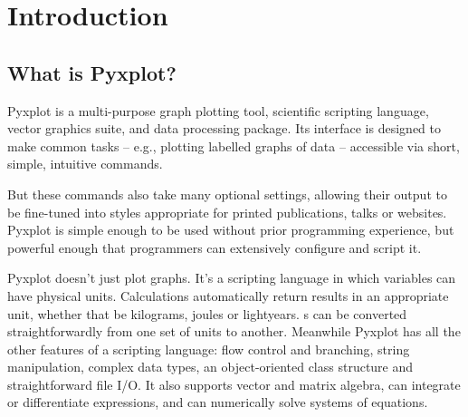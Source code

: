 %
%
%
%
%



\chapter{Introduction}

\label{ch:introduction}

\section{What is Pyxplot?}

Pyxplot is a multi-purpose graph plotting tool, scientific scripting language,
vector graphics suite, and data processing package.  Its interface is designed
to make common tasks -- e.g., plotting labelled graphs of data -- accessible
via short, simple, intuitive commands.

But these commands also take many optional settings, allowing their output to
be fine-tuned into styles appropriate for printed publications, talks or
websites.  Pyxplot is simple enough to be used without prior programming
experience, but powerful enough that programmers can extensively configure and
script it.


Pyxplot doesn't just plot graphs. It's a scripting language in which variables
can have physical units. Calculations automatically return results in an
appropriate unit, whether that be kilograms, joules or lightyears.  \Datafile s
can be converted straightforwardly from one set of units to another. Meanwhile
Pyxplot has all the other features of a scripting language: flow control and
branching, string manipulation, complex data types, an object-oriented class
structure and straightforward file I/O.  It also supports vector and matrix
algebra, can integrate or differentiate expressions, and can numerically solve
systems of equations.

